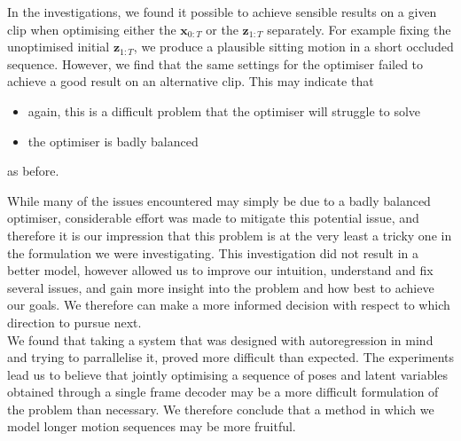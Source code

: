 In the investigations, we found it possible to achieve sensible results on a given clip when optimising either the $\mathbf{x}_{0:T}$ or the $\mathbf{z}_{1:T}$ separately. For example fixing the unoptimised initial $\mathbf{z}_{1:T}$, we produce a plausible sitting motion in a short occluded sequence. However, we find that the same settings for the optimiser failed to achieve a good result on an alternative clip. This may indicate that 
\begin{itemize}
    \item again, this is a difficult problem that the optimiser will struggle to solve
    \item the optimiser is badly balanced
\end{itemize} as before.

While many of the issues encountered may simply be due to a badly balanced optimiser, considerable effort was made to mitigate this potential issue, and therefore it is our impression that this problem is at the very least a tricky one in the formulation we were investigating. This investigation did not result in a better model, however allowed us to improve our intuition, understand and fix several issues, and gain more insight into the problem and how best to achieve our goals. We therefore can make a more informed decision with respect to which direction to pursue next. \\
We found that taking a system that was designed with autoregression in mind and trying to parrallelise it, proved more difficult than expected. The experiments lead us to believe that jointly optimising a sequence of poses and latent variables obtained through a single frame decoder may be a more difficult formulation of the problem than necessary. We therefore conclude that a method in which we model longer motion sequences may be more fruitful.